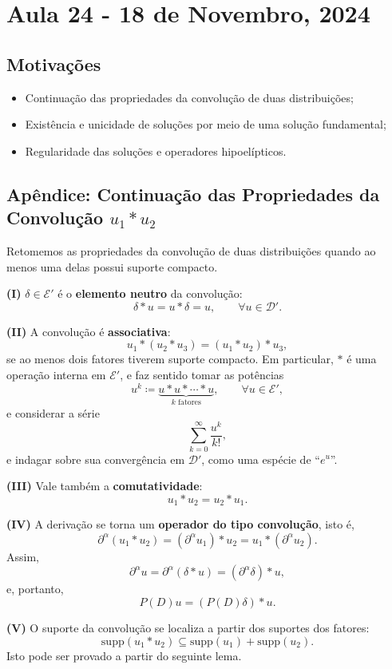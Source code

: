 \documentclass[../distribution_theory_notes.tex]{subfiles}
\begin{document}
\section{Aula 24 - 18 de Novembro, 2024}
\subsection{Motivações}
\begin{itemize}
	\item Continuação das propriedades da convolução de duas distribuições;
	\item Existência e unicidade de soluções por meio de uma solução fundamental;
	\item Regularidade das soluções e operadores hipoelípticos.
\end{itemize}

\subsection{Apêndice: Continuação das Propriedades da Convolução \(u_{1}*u_{2}\)}
Retomemos as propriedades da convolução de duas distribuições quando ao menos uma delas possui suporte compacto.

\medskip
\noindent\textbf{(I)} \(\delta\in\mathcal{E}'\) é o \textbf{elemento neutro} da convolução:
\[
	\delta*u=u*\delta=u,
	\qquad \forall u\in\mathcal{D}'.
\]

\medskip
\noindent\textbf{(II)} A convolução é \textbf{associativa}:
\[
	u_{1}*(u_{2}*u_{3})=(u_{1}*u_{2})*u_{3},
\]
se ao menos dois fatores tiverem suporte compacto. Em particular, \(*\) é uma operação interna em \(\mathcal{E}'\), e faz sentido tomar as potências
\[
	u^{k}\coloneqq \underbrace{u*u*\cdots*u}_{k\text{ fatores}},
	\qquad \forall u\in\mathcal{E}',
\]
e considerar a série
\[
	\sum_{k=0}^{\infty}\frac{u^{k}}{k!},
\]
e indagar sobre sua convergência em \(\mathcal{D}'\), como uma espécie de ``\(e^{u}\)''.

\medskip
\noindent\textbf{(III)} Vale também a \textbf{comutatividade}:
\[
	u_{1}*u_{2}=u_{2}*u_{1}.
\]

\medskip
\noindent\textbf{(IV)} A derivação se torna um \textbf{operador do tipo convolução}, isto é,
\[
	\partial^{\alpha}(u_{1}*u_{2})
	=(\partial^{\alpha}u_{1})*u_{2}
	=u_{1}*(\partial^{\alpha}u_{2}).
\]
Assim,
\[
	\partial^{\alpha}u
	=\partial^{\alpha}(\delta*u)
	=(\partial^{\alpha}\delta)*u,
\]
e, portanto,
\[
	P(D)u=(P(D)\delta)*u.
\]

\medskip
\noindent\textbf{(V)} O suporte da convolução se localiza a partir dos suportes dos fatores:
\[
	\mathrm{supp}(u_{1}*u_{2})
	\subseteq \mathrm{supp}(u_{1})+\mathrm{supp}(u_{2}).
\]
Isto pode ser provado a partir do seguinte lema.
\end{document}
